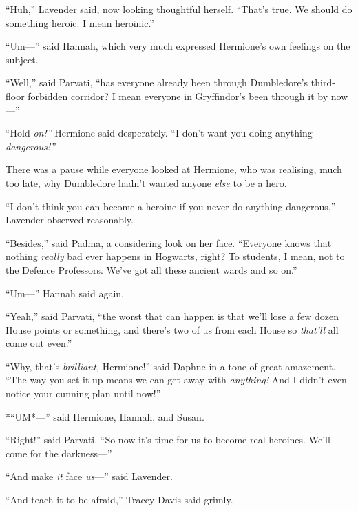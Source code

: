 ``Huh,'' Lavender said, now looking thoughtful herself. ``That's true.
We should do something heroic. I mean heroinic.''

``Um---'' said Hannah, which very much expressed Hermione's own feelings
on the subject.

``Well,'' said Parvati, ``has everyone already been through Dumbledore's
third-floor forbidden corridor? I mean everyone in Gryffindor's been
through it by now---''

``Hold \emph{on!''} Hermione said desperately. ``I don't want you doing
anything \emph{dangerous!''}

There was a pause while everyone looked at Hermione, who was realising,
much too late, why Dumbledore hadn't wanted anyone \emph{else} to be a
hero.

``I don't think you can become a heroine if you never do anything
dangerous,'' Lavender observed reasonably.

``Besides,'' said Padma, a considering look on her face. ``Everyone
knows that nothing \emph{really} bad ever happens in Hogwarts, right? To
students, I mean, not to the Defence Professors. We've got all these
ancient wards and so on.''

``Um---'' Hannah said again.

``Yeah,'' said Parvati, ``the worst that can happen is that we'll lose a
few dozen House points or something, and there's two of us from each
House so \emph{that'll} all come out even.''

``Why, that's \emph{brilliant,} Hermione!'' said Daphne in a tone of
great amazement. ``The way you set it up means we can get away with
\emph{anything!} And I didn't even notice your cunning plan until now!''

*``UM*---'' said Hermione, Hannah, and Susan.

``Right!'' said Parvati. ``So now it's time for us to become real
heroines. We'll come for the darkness---''

``And make \emph{it} face \emph{us}---'' said Lavender.

``And teach it to be afraid,'' Tracey Davis said grimly.
